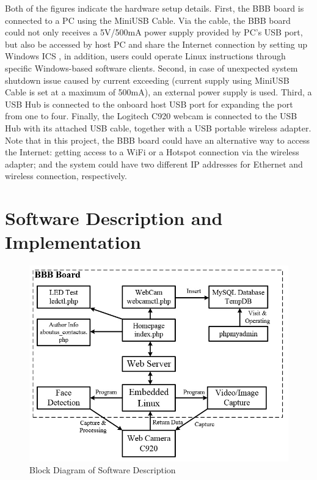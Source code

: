 \documentclass[12pt,journal,draftclsnofoot,onecolumn]{IEEEtran}
\begin{document}
Both of the figures indicate the hardware setup details. First, the BBB board is connected to a PC using the MiniUSB Cable. Via the cable, the BBB board could not only receives a 5V/500mA power supply provided by PC's USB port, but also be accessed by host PC and share the Internet connection by setting up Windows ICS \cite{windowsICS}, in addition, users could operate Linux instructions through specific Windows-based software clients. Second, in case of unexpected system shutdown issue caused by current exceeding (current supply using MiniUSB Cable is set at a maximum of 500mA), an external power supply is used. Third, a USB Hub is connected to the onboard host USB port for expanding the port from one to four. Finally, the Logitech C920 webcam is connected to the USB Hub with its attached USB cable, together with a USB portable wireless adapter. Note that in this project, the BBB board could have an alternative way to access the Internet: getting access to a WiFi or a Hotspot connection via the wireless adapter; and the system could have two different IP addresses for Ethernet and wireless connection, respectively.


\section{Software Description and Implementation}\label{SfDes}
\begin{figure}[ht]
	\centering
	\includegraphics[width=5in]{./figs/sw1.jpg}
	\caption{Block Diagram of Software Description}
	\label{sw1}
\end{figure}
\end{document}
